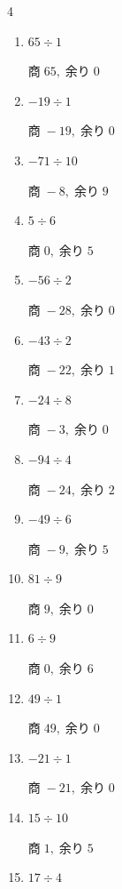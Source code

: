 \begin{multicols}{4}
\begin{enumerate}
  \item $65 \div 1$

        $商\; 65,\; 余り\; 0$

  \item $-19 \div 1$

        $商\; -19,\; 余り\; 0$

  \item $-71 \div 10$

        $商\; -8,\; 余り\; 9$

  \item $5 \div 6$

        $商\; 0,\; 余り\; 5$

  \item $-56 \div 2$

        $商\; -28,\; 余り\; 0$

  \item $-43 \div 2$

        $商\; -22,\; 余り\; 1$

  \item $-24 \div 8$

        $商\; -3,\; 余り\; 0$

  \item $-94 \div 4$

        $商\; -24,\; 余り\; 2$

  \item $-49 \div 6$

        $商\; -9,\; 余り\; 5$

  \item $81 \div 9$

        $商\; 9,\; 余り\; 0$

\columnbreak %

\resetques

  \item $6 \div 9$

        $商\; 0,\; 余り\; 6$

  \item $49 \div 1$

        $商\; 49,\; 余り\; 0$

  \item $-21 \div 1$

        $商\; -21,\; 余り\; 0$

  \item $15 \div 10$

        $商\; 1,\; 余り\; 5$

  \item $17 \div 4$


\end{enumerate}
\end{multicols}
